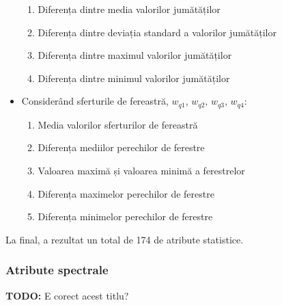 \begin{itemize}
\begin{enumerate}
		\item Diferența dintre media valorilor jumătăților
		\item Diferența dintre deviația standard a valorilor jumătăților
		\item Diferența dintre maximul valorilor jumătăților
		\item Diferența dintre minimul valorilor jumătăților
	\end{enumerate}
	\item Considerând sferturile de fereastră, $w_{q1}$, $w_{q2}$, $w_{q3}$, $w_{q4}$:
		\begin{enumerate}
		\item Media valorilor sferturilor de fereastră
		\item Diferența mediilor perechilor de ferestre
		\item Valoarea maximă și valoarea minimă a ferestrelor
		\item Diferența maximelor perechilor de ferestre
		\item Diferența minimelor perechilor de ferestre
	\end{enumerate}
\end{itemize}

La final, a rezultat un total de 174 de atribute statistice.

\subsubsection*{Atribute spectrale}
\textbf{TODO:} E corect acest titlu?

